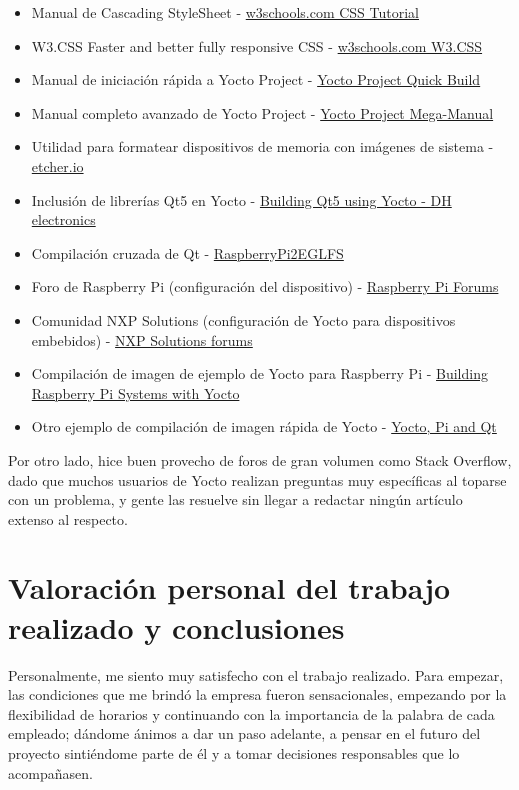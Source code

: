 \documentclass[13pt]{scrartcl}
\begin{document}
		\begin{itemize}
			\item Manual de Cascading StyleSheet - \href{https://www.w3schools.com/css/default.asp}{w3schools.com CSS Tutorial}
			\item W3.CSS Faster and better fully responsive CSS - \href{https://www.w3schools.com/w3css/default.asp}{w3schools.com W3.CSS}
			\item Manual de iniciación rápida a Yocto Project - \href{https://www.yoctoproject.org/docs/2.5/brief-yoctoprojectqs/brief-yoctoprojectqs.html}{Yocto Project Quick Build}
			\item Manual completo avanzado de Yocto Project - \href{https://www.yoctoproject.org/docs/2.4/mega-manual/mega-manual.html}{Yocto Project Mega-Manual}
			\item Utilidad para formatear dispositivos de memoria con imágenes de sistema - \href{https://etcher.io}{etcher.io}
			\item Inclusión de librerías Qt5 en Yocto - \href{http://wiki.dh-electronics.com/index.php?title=Building_Qt5_using_Yocto}{Building Qt5 using Yocto - DH electronics}
			\item Compilación cruzada de Qt - \href{https://wiki.qt.io/RaspberryPi2EGLFS}{RaspberryPi2EGLFS}
			\item Foro de Raspberry Pi (configuración del dispositivo) - \href{https://www.raspberrypi.org/forums/}{Raspberry Pi Forums}
			\item Comunidad NXP Solutions (configuración de Yocto para dispositivos embebidos) - \href{https://community.nxp.com/}{NXP Solutions forums}
			\item Compilación de imagen de ejemplo de Yocto para Raspberry Pi - \href{http://www.jumpnowtek.com/rpi/Raspberry-Pi-Systems-with-Yocto.html}{Building Raspberry Pi Systems with Yocto}
			\item Otro ejemplo de compilación de imagen rápida de Yocto - \href{https://medium.com/@shigmas/yocto-pi-and-qt-e9f2df38a610}{Yocto, Pi and Qt}
		\end{itemize}
	
		Por otro lado, hice buen provecho de foros de gran volumen como Stack Overflow, dado que muchos usuarios de Yocto realizan preguntas muy específicas al toparse con un problema, y gente las resuelve sin llegar a redactar ningún artículo extenso al respecto.
	
	\section{Valoración personal del trabajo realizado y conclusiones}
		Personalmente, me siento muy satisfecho con el trabajo realizado. Para empezar, las condiciones que me brindó la empresa fueron sensacionales, empezando por la flexibilidad de horarios y continuando con la importancia de la palabra de cada empleado; dándome ánimos a dar un paso adelante, a pensar en el futuro del proyecto sintiéndome parte de él y a tomar decisiones responsables que lo acompañasen.\\
		
\end{document}

